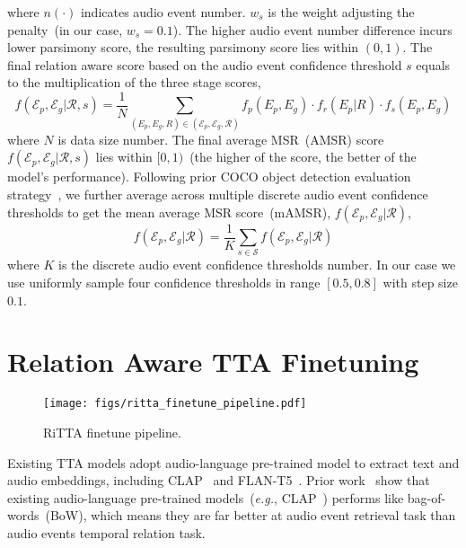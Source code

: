 \noindent where $n(\cdot)$ indicates audio event number. $w_s$ is the weight adjusting the penalty~(in our case, $w_s=0.1$). The higher audio event number difference incurs lower parsimony score, the resulting parsimony score lies within $(0,1)$. The final relation aware score based on the audio event confidence threshold $s$ equals to the multiplication of the three stage scores,
\begin{equation}
    f(\mathcal{E}_p, \mathcal{E}_g|\mathcal{R}, s) = \frac{1}{N}  \sum_{(E_p, E_g, R) \in (\mathcal{E}_p, \mathcal{E}_g, \mathcal{R})} f_p(E_p, E_g) \cdot f_r(E_p|R) \cdot f_s(E_p, E_g)
\label{eqn:MSR}
\end{equation}
\noindent where $N$ is data size number. The final average MSR~(AMSR) score $f(\mathcal{E}_p, \mathcal{E}_g|\mathcal{R}, s)$ lies within $[0, 1)$~(the higher of the score, the better of the model's performance). Following prior COCO object detection evaluation strategy~\citep{coco_dataset}, we further average across multiple discrete audio event confidence thresholds to get the mean average MSR score~(mAMSR), $f(\mathcal{E}_p, \mathcal{E}_g|\mathcal{R})$,
\begin{equation}
    f(\mathcal{E}_p, \mathcal{E}_g|\mathcal{R}) = \frac{1}{K}  \sum_{s\in \mathcal{S}} f(\mathcal{E}_p, \mathcal{E}_g|\mathcal{R})
\label{eqn:mMSR}
\end{equation}
\noindent where $K$ is the discrete audio event confidence thresholds number. In our case we use uniformly sample four confidence thresholds in range $[0.5, 0.8]$ with step size $0.1$.

\section{Relation Aware TTA Finetuning}
\label{sec:relation_finetune}

\begin{wrapfigure}{r}{0.35\textwidth}
    \centering
    \texttt{[image: figs/ritta\_finetune\_pipeline.pdf]}
    \vspace{-2mm}
    \caption{\small RiTTA finetune pipeline.}
    \label{fig:ritta_finetune_pipeline}
    \vspace{-3mm}
\end{wrapfigure}
Existing TTA models adopt audio-language pre-trained model to extract text and audio embeddings, including CLAP~\citep{laionclap2023} and FLAN-T5~\citep{FLAN-T5}. Prior work~\citep{ma2023crepe,yuksekgonul2023when,audiotext_noNL,ghosh2024compa} show that existing audio-language pre-trained models~(\textit{e.g.}, CLAP~\citep{laionclap2023}) performs like bag-of-words~(BoW), which means they are far better at audio event retrieval task than audio events temporal relation task. 

